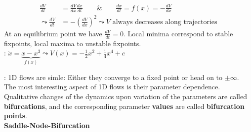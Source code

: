 \begin{align*}
	\frac{dV}{dt}&=\frac{dV}{dx}\frac{dx}{dt}\qquad\&\qquad\frac{dx}{dt}=f(x)=-\frac{dV}{dx}\\
	\leadsto \frac{dV}{dt}&=-\left(\frac{dV}{dx}\right)^2 \leadsto V \text{ always decreases along trajectories}
\end{align*}
At an equilibrium point we have $\frac{dV}{dt}=0$. Local minima correspond to stable fixpoints, local maxima to unstable fixpoints.\\
\underline{}: $\dot{x}=\underset{f(x)}{\underbrace{x-x^3}} \leadsto V(x)=-\frac{1}{2}x^2+\frac{1}{4}x^4+c$
\begin{figure}[H]
\end{figure}
\textbf{\underline{}}: 1D flows are simle: Either they converge to a fixed point or head on to $\pm\infty$. The most interesting aspect of 1D flows is their parameter dependence.\\
Qualitative changes of the dynamics upon variation of the parameters are called \textbf{bifurcations}, and the corresponding parameter \textbf{values} are called \textbf{bifurcation points}.\\
\textbf{Saddle-Node-Bifurcation}
